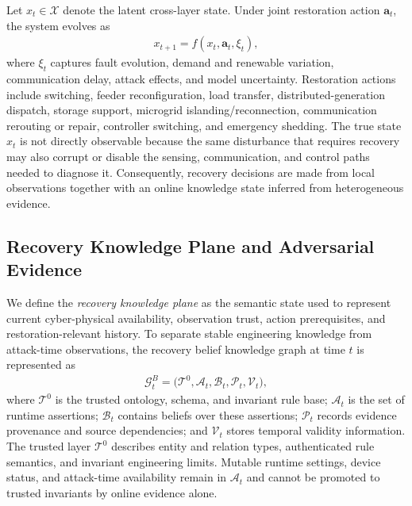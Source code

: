 Let $x_t\in\mathcal{X}$ denote the latent cross-layer state. Under joint restoration action $\mathbf{a}_t$, the system evolves as
\begin{align}
\label{eq-system-transition}
x_{t+1}=f(x_t,\mathbf{a}_t,\xi_t),
\end{align}
where $\xi_t$ captures fault evolution, demand and renewable variation, communication delay, attack effects, and model uncertainty. Restoration actions include switching, feeder reconfiguration, load transfer, distributed-generation dispatch, storage support, microgrid islanding/reconnection, communication rerouting or repair, controller switching, and emergency shedding. The true state $x_t$ is not directly observable because the same disturbance that requires recovery may also corrupt or disable the sensing, communication, and control paths needed to diagnose it. Consequently, recovery decisions are made from local observations together with an online knowledge state inferred from heterogeneous evidence.

\subsection{Recovery Knowledge Plane and Adversarial Evidence}
\label{subsec-recovery-knowledge-plane}
We define the \emph{recovery knowledge plane} as the semantic state used to represent current cyber-physical availability, observation trust, action prerequisites, and restoration-relevant history. To separate stable engineering knowledge from attack-time observations, the recovery belief knowledge graph at time $t$ is represented as
\begin{align}
\label{eq-kg}
\mathcal{G}^{B}_t=
\big(\mathcal{T}^{0},\mathcal{A}_t,\mathcal{B}_t,\mathcal{P}_t,\mathcal{V}_t\big),
\end{align}
where $\mathcal{T}^{0}$ is the trusted ontology, schema, and invariant rule base; $\mathcal{A}_t$ is the set of runtime assertions; $\mathcal{B}_t$ contains beliefs over these assertions; $\mathcal{P}_t$ records evidence provenance and source dependencies; and $\mathcal{V}_t$ stores temporal validity information. The trusted layer $\mathcal{T}^{0}$ describes entity and relation types, authenticated rule semantics, and invariant engineering limits. Mutable runtime settings, device status, and attack-time availability remain in $\mathcal{A}_t$ and cannot be promoted to trusted invariants by online evidence alone.

